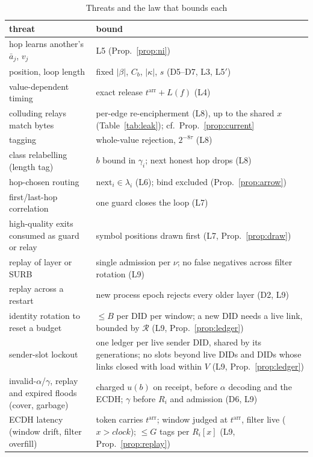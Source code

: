 \documentclass[journal]{IEEEtran}
\newcommand{\nxt}{\mathrm{next}}
\newcommand{\arr}{t^{\mathrm{arr}}}
\begin{document}
\begin{table}[t]
\caption{Threats and the law that bounds each}
\label{tab:threats}
\centering\small
\begin{tabular}{@{}>{\raggedright\arraybackslash}p{}>{\raggedright\arraybackslash}p{}@{}}
\toprule
threat & bound \\
\midrule
hop learns another's $\bar a_j$, $v_j$ & L5 (Prop.~\ref{prop:ni}) \\
position, loop length & fixed $|\beta|$, $C_b$, $|\kappa|$, $s$ (D5--D7, L3, L5$'$) \\
value-dependent timing & exact release $\arr+L(f)$ (L4) \\
colluding relays match bytes & per-edge re-encipherment (L8), up to the shared $x$ (Table~\ref{tab:leak}); cf.\ Prop.~\ref{prop:current} \\
tagging & whole-value rejection, $2^{-8\tau}$ (L8) \\
class relabelling (length tag) & $b$ bound in $\gamma_i$; next honest hop drops (L8) \\
hop-chosen routing & $\nxt_i\in\lambda_i$ (L6); bind excluded (Prop.~\ref{prop:arrow}) \\
first/last-hop correlation & one guard closes the loop (L7) \\
high-quality exits consumed as guard or relay & symbol positions drawn first (L7, Prop.~\ref{prop:draw}) \\
replay of layer or SURB & single admission per $\nu$; no false negatives across filter rotation (L9) \\
replay across a restart & new process epoch rejects every older layer (D2, L9) \\
identity rotation to reset a budget & $\le B$ per DID per window; a new DID needs a live link, bounded by $\mathcal R$ (L9, Prop.~\ref{prop:ledger}) \\
sender-slot lockout & one ledger per live sender DID, shared by its generations; no slots beyond live DIDs and DIDs whose links closed with load within $V$ (L9, Prop.~\ref{prop:ledger}) \\
invalid-$\alpha$/$\gamma$, replay and expired floods (cover, garbage) & charged $u(b)$ on receipt, before $\alpha$ decoding and the ECDH; $\gamma$ before $R_i$ and admission (D6, L9) \\
ECDH latency (window drift, filter overfill) & token carries $\arr$; window judged at $\arr$, filter live ($x>\mathit{clock}$); $\le G$ tags per $R_i[x]$ (L9, Prop.~\ref{prop:replay}) \\

\end{tabular}
\end{table}
\end{document}
